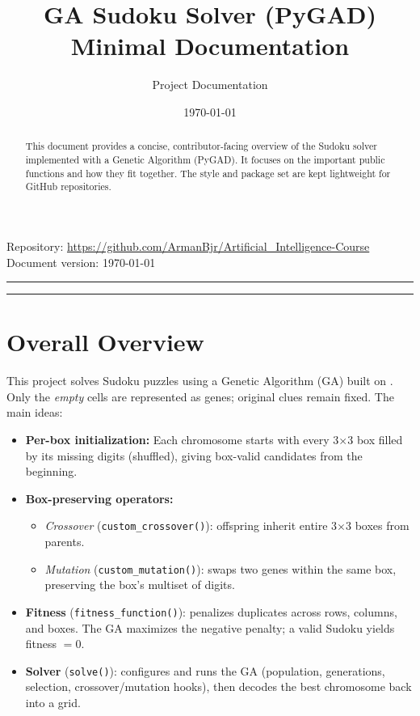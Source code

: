 \documentclass[11pt,a4paper]{article}
\title{\textbf{GA Sudoku Solver (PyGAD)}\\
	\large Minimal Documentation}
\author{Project Documentation}
\date{\today}
\newcommand{\code}[1]{\texttt{\detokenize{#1}}}
\newcommand{\func}[1]{\texttt{#1()}}
\begin{document}
	\maketitle

	\begin{center}
		\vspace{-0.5em}
		\small
		Repository: \href{github.com/ArmanBjr/Artificial_Intelligence-Course}{https://github.com/ArmanBjr/Artificial\_Intelligence-Course} \\
		Document version: \today
	\end{center}

	\hrule
	\vspace{0.8em}

	\begin{abstract}
		This document provides a concise, contributor-facing overview of the Sudoku solver implemented with a Genetic Algorithm (PyGAD). It focuses on the important public functions and how they fit together. The style and package set are kept lightweight for GitHub repositories.
	\end{abstract}

	\vspace{0.5em}
	\tableofcontents
	\vspace{0.8em}
	\hrule
	\vspace{1.2em}

	\section{Overall Overview}
	This project solves Sudoku puzzles using a Genetic Algorithm (GA) built on \code{pygad}. Only the \emph{empty} cells are represented as genes; original clues remain fixed. The main ideas:

	\begin{itemize}[leftmargin=1.2em]
		\item \textbf{Per-box initialization:} Each chromosome starts with every 3$\times$3 box filled by its missing digits (shuffled), giving box-valid candidates from the beginning.
		\item \textbf{Box-preserving operators:}
		\begin{itemize}
			\item \emph{Crossover} (\func{custom\_crossover}): offspring inherit entire 3$\times$3 boxes from parents.
			\item \emph{Mutation} (\func{custom\_mutation}): swaps two genes within the same box, preserving the box’s multiset of digits.
		\end{itemize}
		\item \textbf{Fitness} (\func{fitness\_function}): penalizes duplicates across rows, columns, and boxes. The GA maximizes the negative penalty; a valid Sudoku yields fitness $=0$.
		\item \textbf{Solver} (\func{solve}): configures and runs the GA (population, generations, selection, crossover/mutation hooks), then decodes the best chromosome back into a grid.
	\end{itemize}
\end{document}
